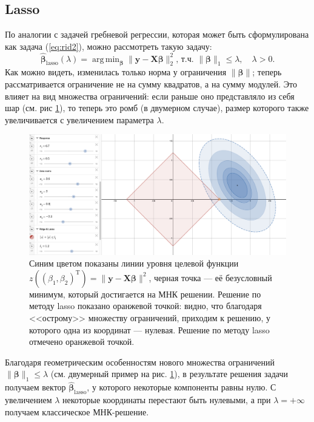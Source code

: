 \documentclass[12pt,a4paper,final]{article}
\newcommand{\betah}{\hat{\bm \beta}}
\newcommand{\betaa}{\bm{\beta}}
\newcommand{\X}{\bm{X}}
\newcommand{\1}{\mathds{1}}
\DeclareMathOperator*{\argmin}{arg\,min}
\begin{document}
\subsection{Lasso}
По аналогии с задачей гребневой регрессии, которая может быть сформулирована как задача (\ref{eq:rid2}), можно рассмотреть такую задачу:
\begin{equation}
\label{eq:las}
\betah_{\text{lasso}}(\lambda) = \argmin_{\betaa}{\|\bm y - \X\betaa\|^2_2 \text{, т.ч. } \|\betaa\|_1 \leqslant \lambda}, \quad \lambda >0.
\end{equation}
Как можно видеть, изменилась только норма у ограничения $\|\betaa\|$; теперь рассматривается ограничение не на сумму квадратов, а на сумму модулей. Это влияет на вид множества ограничений: если раньше оно представляло из себя шар (см. рис \ref{fig:rid_des}), то теперь это ромб (в двумерном случае), размер которого также увеличивается с увеличением параметра $\lambda$.
\begin{figure}[]
\centering
\includegraphics[width=1\textwidth]{lasso1.png}
\caption{Синим цветом показаны линии уровня целевой функции $ z((\beta_1,\beta_2)^\mathrm{T}) = \|\bm y - \X \betaa\|^2$, черная точка --- её безусловный минимум, который достигается на МНК решении. Решение по методу lasso показано оранжевой точкой: видно, что благодаря <<острому>> множеству ограничений, приходим к решению, у которого одна из координат --- нулевая. Решение по методу lasso отмечено оранжевой точкой.}
\label{fig:rid_des}
\end{figure}

Благодаря геометрическим особенностям нового множества ограничений $\|\betaa\|_1 \leqslant \lambda$ (см. двумерный пример на рис. \ref{fig:rid_des}), в результате решения задачи получаем вектор $\betah_{\text{lasso}}$, у которого некоторые компоненты равны нулю. С увеличением $\lambda$ некоторые координаты перестают быть нулевыми, а при $\lambda =+ \infty$ получаем классическое МНК-решение.
\end{document}
